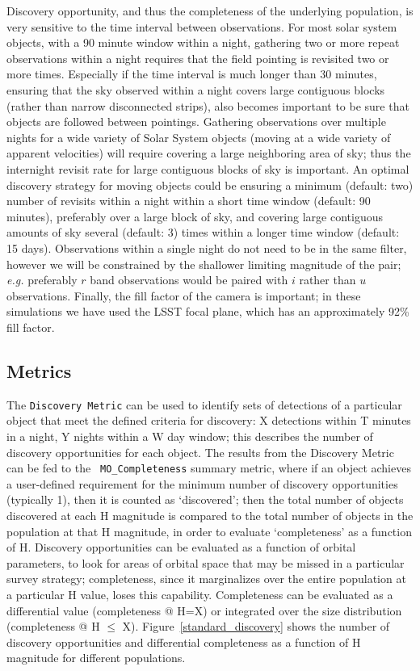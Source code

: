 Discovery opportunity, and thus the completeness of the underlying
population, is very sensitive to the time interval between
observations. For most solar system objects, with a 90 minute window
within a night, gathering two or more repeat observations within a night requires
that the field pointing is revisited two or more times. Especially if the time
interval is much longer than 30 minutes, ensuring that the sky
observed within a night covers large contiguous blocks (rather than
narrow disconnected strips), also becomes important to be sure that
objects are followed between pointings.  Gathering
observations over multiple nights for a wide variety of Solar System
objects (moving at a wide variety of apparent velocities) will require covering a large
neighboring area of sky; thus the internight revisit rate for large contiguous
blocks of sky is important. An optimal discovery strategy for moving
objects could be ensuring a minimum (default: two) number of revisits
within a night within a short time window (default: 90 minutes),
preferably over a large block of sky, and
covering large contiguous amounts of sky several (default: 3) times within a
longer time window (default: 15 days).  Observations within a single
night do not need to be in the same filter, however we will be
constrained by the shallower limiting magnitude of the pair; {\it e.g.}
preferably $r$ band observations would be paired with $i$ rather than
$u$ observations. Finally, the fill factor of the camera is important;
in these simulations we have used the LSST focal plane, which has an
approximately 92\% fill factor.


\subsection{Metrics}
\label{sec:\secname:metrics}

The {\tt Discovery Metric} can be used to identify sets of detections
of a particular object that meet the defined criteria for discovery: X
detections within T minutes in a night, Y nights within a W day
window; this describes the number of discovery opportunities for each object.
The results from the Discovery Metric can be fed to the {\tt
  MO\_Completeness} summary metric, where if an object achieves a
user-defined requirement for the minimum number of discovery
opportunities (typically 1), then it is counted as `discovered'; then
the total number of objects discovered at each H magnitude is compared
to the total number of objects in the population at that H magnitude,
in order to evaluate `completeness' as a function of H. Discovery
opportunities can be evaluated as a function of orbital parameters, to
look for areas of orbital space that may be missed in a particular
survey strategy; completeness, since it marginalizes over the entire
population at a particular H value, loses this
capability. Completeness can be evaluated as a differential value
(completeness @ H=X) or integrated over the size distribution
(completeness @ H $\leq$ X).
Figure~\ref{standard_discovery} shows the number of discovery opportunities
and differential completeness as a function of H magnitude
for different populations.

